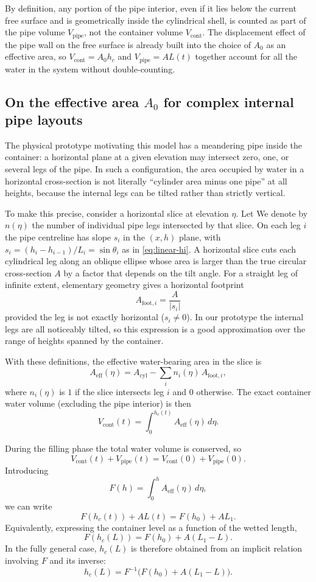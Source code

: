 \documentclass[11pt]{article}
\begin{document}
By definition, any portion of the pipe interior, even if it lies below the current free surface
and is geometrically inside the cylindrical shell, is counted as part of the pipe volume
$V_{\text{pipe}}$, not the container volume $V_{\text{cont}}$. The displacement effect of the
pipe wall on the free surface is already built into the choice of $A_0$ as an effective area,
so $V_{\text{cont}} = A_0 h_c$ and $V_{\text{pipe}} = A L(t)$ together account for all the
water in the system without double-counting.

\subsection{On the effective area $A_0$ for complex internal pipe layouts}

The physical prototype motivating this model has a meandering pipe inside the container: a
horizontal plane at a given elevation may intersect zero, one, or several legs of the pipe.
In such a configuration, the area occupied by water in a horizontal cross-section is not
literally ``cylinder area minus one pipe'' at all heights, because the internal legs can be
tilted rather than strictly vertical.

To make this precise, consider a horizontal slice at elevation $\eta$. Let
We denote by $n(\eta)$ the number of individual pipe legs intersected by that slice. On
each leg $i$ the pipe centreline has slope $s_i$ in the $(x,h)$ plane, with
$s_i = (h_i-h_{i-1})/L_i = \sin\theta_i$ as in \eqref{eq:linear-hi}. A horizontal slice cuts
each cylindrical leg along an oblique ellipse whose area is larger than the true circular
cross-section $A$ by a factor that depends on the tilt angle. For a straight leg of infinite
extent, elementary geometry gives a horizontal footprint
\[
  A_{\text{foot},i} = \frac{A}{|s_i|}
\]
provided the leg is not exactly horizontal ($s_i\neq 0$). In our prototype the internal legs
are all noticeably tilted, so this expression is a good approximation over the range of
heights spanned by the container.

With these definitions, the effective water-bearing area in the slice is
\[
  A_{\text{eff}}(\eta)
  = A_{\text{cyl}} - \sum_{i} n_i(\eta)\,A_{\text{foot},i},
\]
where $n_i(\eta)$ is $1$ if the slice intersects leg $i$ and $0$ otherwise. The exact
container water volume (excluding the pipe interior) is then
\[
  V_{\text{cont}}(t)
  = \int_0^{h_c(t)} A_{\text{eff}}(\eta)\,d\eta.
\]

During the filling phase the total water volume is conserved, so
\[
  V_{\text{cont}}(t) + V_{\text{pipe}}(t)
  = V_{\text{cont}}(0) + V_{\text{pipe}}(0).
\]
Introducing
\[
  F(h) = \int_0^{h} A_{\text{eff}}(\eta)\,d\eta,
\]
we can write
\[
  F(h_c(t)) + A L(t) = F(h_0) + A L_1.
\]
Equivalently, expressing the container level as a function of the wetted length,
\[
  F(h_c(L)) = F(h_0) + A (L_1 - L).
\]
In the fully general case, $h_c(L)$ is therefore obtained from an implicit relation involving
$F$ and its inverse:
\[
  h_c(L) = F^{-1}\Big(F(h_0) + A (L_1 - L)\Big).
\]
\end{document}
